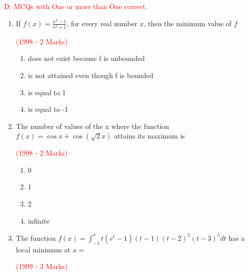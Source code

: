 \documentclass[journal,12pt,twocolumn]{IEEEtran}
\theoremstyle{remark}
\begin{document}
    \begin{flushleft}
        \textcolor{red}{D: MCQs with One or more than One correct.}
    \end{flushleft}
    \begin{enumerate}[start = 7]
    \item{
        \begin{flushleft}
            If $f(x) = \displaystyle \frac{x^2-1}{x^2+1}$, for every real number $x$, then the minimum value of $f$
            \begin{flushright}
                \textcolor{red}{(1998 - 2 Marks)}
            \end{flushright}
            \begin{enumerate}
                \item does not exist because f is unbounded
                \item is not attained even though f is bounded
                \item is equal to 1
                \item is equal to -1
            \end{enumerate}
        \end{flushleft}  }
    \item{
        \begin{flushleft}
            The number of values of the x where the function $f(x)=\cos x + \cos(\sqrt{2}x)$ attains its maximum is
            \begin{flushright}
                \textcolor{red}{(1998 - 2 Marks)}
            \end{flushright}
            \begin{enumerate}
                \item 0
                \item 1
                \item 2
                \item infinite
            \end{enumerate}
        \end{flushleft}
        }
    \item{
     \begin{flushleft}
            The function $f(x)= \int_{-1}^x t(e^t-1)(t-1)(t-2)^3(t-3)^5dt$ has a local minimum at $x=$
            \begin{flushright}
                \textcolor{red}{(1999 - 3 Marks)}
            \end{flushright}
            \begin{enumerate}

\end{enumerate}
\end{flushleft}}
\end{enumerate}
\end{document}
